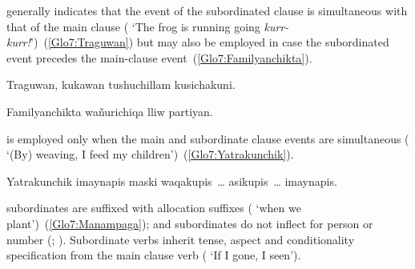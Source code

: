 \noindent
{} generally indicates that the event of the subordinated clause is simultaneous with that of the main clause (   ‘The frog is running going \emph{kurr-kurr!}’)~(\ref{Glo7:Traguwan}) but may also be employed in case the subordinated event precedes the main-clause event~(\ref{Glo7:Familyanchikta}).

%
{Traguwan, kukawan tushuchillam kusichakuni.}%
{}%
{}{}%

%
{Familyanchikta wañurichiqa lliw partiyan.}%
{}%
{}{}%

\noindent
{} is employed only when the main and subordinate clause events are simultaneous (   ‘(By) weaving, I feed my children’)~(\ref{Glo7:Yatrakunchik}).

%
{Yatrakunchik imaynapis maski waqakupis~\dots{} asikupis~\dots{} imaynapis.}%
{}%
{}{}%

\noindent
{} subordinates are suffixed with allocation suffixes ( ‘when we plant’)~(\ref{Glo7:Manampaga});  and  subordinates do not inflect for person or number (; ). Subordinate verbs inherit tense, aspect and conditionality specification from the main clause verb (  ‘If I  gone, I  seen’).


